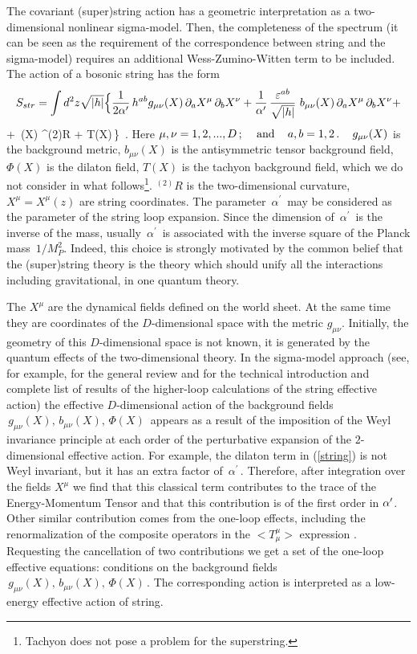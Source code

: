 The covariant (super)string action has a geometric interpretation 
as a two-dimensional nonlinear sigma-model. Then, the completeness 
of the spectrum (it can be seen as the requirement of the 
correspondence between string and the sigma-model) requires an 
additional Wess-Zumino-Witten term
to be included. The action of a bosonic string has the form
$$
S_{str} = \int {d^2}z \sqrt{|h|} \Big\{ {1\over {2 \alpha'}}
\,h^{ab} g_{\mu\nu}(X)\,
\partial_a X^\mu\, \partial_b X^\nu + {1\over {\alpha'}}\,
{\varepsilon^{ab}\over {\sqrt {|h|}}}\,\,b_{\mu\nu}(X)\,
\partial_a X^\mu\, \partial_b X^\nu +
$$
\beq
+ \,\Phi(X)\,\,^{(2)}R + T(X)\,\Big\} \,. 
\label{string}
\eeq
Here $\mu,\nu = 1,2,...,D\,;\,\,\,\,\,\,\, {\rm and}\,\,\,\,\,\,\,     
a,b = 1,2\,.\,\,\,\,\,\,\, g_{\mu\nu}(X)$ is the background
metric, $b_{\mu\nu}(X)$ is the antisymmetric tensor background 
field, $\Phi(X)$ is the
dilaton field, $T(X)$ is the tachyon background field, which we
do not consider in what follows\footnote{Tachyon does not pose
a problem for the superstring.}. $^{(2)}R$ is the 
two-dimensional curvature, $X^\mu=X^\mu(z)$ are string coordinates.
The parameter $\,\alpha^\prime\,$ may be considered as 
the parameter of the
string loop expansion. Since the dimension of $\,\alpha^\prime\,$
is the inverse of the mass, usually $\,\alpha^\prime\,$ is 
associated with the inverse square of the Planck mass $\,1/M^2_P$.
Indeed, this choice is strongly motivated by the common belief 
that the (super)string theory is the theory which should unify 
all the interactions including gravitational, in one 
quantum theory. 

The $X^\mu$ are the dynamical fields 
defined on the world sheet. At the same time they are 
coordinates of the $D$-dimensional space with the metric 
$g_{\mu\nu}$. Initially, the geometry of this $D$-dimensional 
space is not known, it is generated by the quantum effects 
of the two-dimensional theory. In the sigma-model approach
(see, for example, \cite{hall,tseytlin} for the general 
review and \cite{ketov} for the technical introduction 
and complete list of results of the higher-loop calculations
of the string effective action) the effective $D$-dimensional 
action of the 
background fields $\,g_{\mu\nu}(X), \,b_{\mu\nu}(X),\,\Phi(X)\,$ 
appears as a result of the imposition of the Weyl invariance
principle at each order of the perturbative 
expansion of the $2$-dimensional 
effective action. For example, the dilaton term in (\ref{string})
is not Weyl invariant, but it has an extra factor of
$\,\alpha^\prime\,$. Therefore, after integration over the
fields $X^\mu$ we find that this classical term contributes to 
the trace of the Energy-Momentum Tensor and that this 
contribution is of the first order in $\alpha^\prime$. Other similar 
contribution comes from the one-loop effects, including the 
renormalization of the composite operators in the $<T_\mu^\mu>$
expression \cite{frts85,CFMP,ketov}. 
Requesting the cancellation of two contributions we get 
a set of the one-loop effective equations: conditions on the
background fields $\,g_{\mu\nu}(X), \,b_{\mu\nu}(X),\,\Phi(X)\,$. 
The corresponding action is interpreted as a low-energy effective 
action of string.

